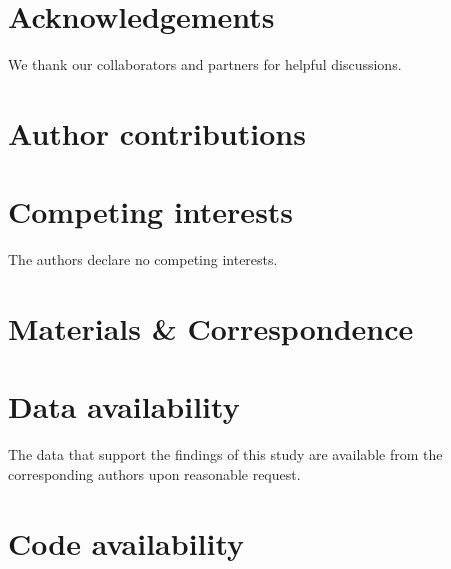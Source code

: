 \documentclass[11pt]{article}
\begin{document}
\FloatBarrier

\section*{Acknowledgements}
We thank our collaborators and partners for helpful discussions.

\section*{Author contributions}

\section*{Competing interests}
The authors declare no competing interests.

\section*{Materials \& Correspondence}

\section*{Data availability}
The data that support the findings of this study are available from the corresponding authors upon reasonable request.

\section*{Code availability}



\end{document}
